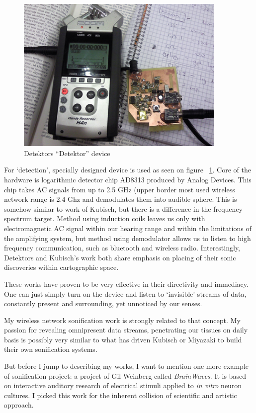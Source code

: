 \documentclass[12pt,a4paper,oneside]{report}
\begin{document}
\begin{figure}  
  \centering
    \includegraphics[width=0.9\textwidth]{img/detektor}
	\caption{Detektors ``Detektor'' device}
	\label{fig:detektor}
\end{figure}

For `detection', specially designed device is used as seen on figure ~\ref{fig:detektor}. Core of the hardware is logarithmic detector chip AD8313 produced by Analog Devices. This chip takes AC signals from up to 2.5 GHz  (upper border most used wireless network range is 2.4 Ghz \cite{802} and demodulates them into audible sphere. This is somehow similar to work of Kubisch, but there is a difference in the frequency spectrum target. Method using induction coils leaves us only with electromagnetic AC signal within our hearing range and within the limitations of the amplifying system, but method using demodulator allows us to listen to high frequency communication, such as bluetooth and wireless radio. Interestingly, Detektors and Kubisch's work both share emphasis on placing of their sonic discoveries within cartographic space.

These works have proven to be very effective in their directivity and immediacy. One can just simply turn on the device and listen to `invisible' streams of data, constantly present and surrounding, yet unnoticed by our senses. 

My wireless network sonification work is strongly related to that concept. My passion for revealing omnipresent data streams, penetrating our tissues on daily basis is possibly very similar to what has driven Kubisch or Miyazaki to build their own sonification systems.  

But before I jump to describing my works, I want to mention one more example of sonification project: a project of Gil Weinberg called \emph{BrainWaves}. It is based on interactive auditory research of electrical stimuli applied to \emph{in vitro} neuron cultures. I picked this work for the inherent collision of scientific and artistic approach.
\end{document}
